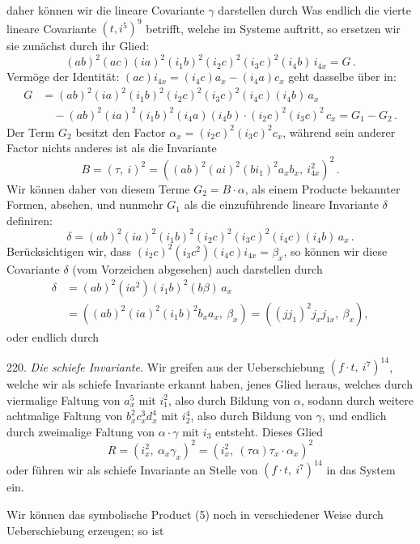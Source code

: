 daher k\"onnen wir die lineare Covariante $\gamma$ darstellen durch
Was endlich die vierte lineare Covariante $(t, i^5)^9$ betrifft, welche im Systeme auftritt, so ersetzen wir sie zun\"achst durch ihr Glied:
\[
(ab)^2(ac)(ia)^2(i_1b)^2(i_2c)^2(i_3c)^2(i_4b)\,i_{4x} = G\,.
\]
Verm\"oge der Identit\"at: $(ac)i_{4x} = (i_4c)a_x - (i_4a)c_x$ geht dasselbe \"uber in:
\[
\begin{aligned}
G &= (ab)^2(ia)^2(i_1b)^2(i_2c)^2(i_3c)^2(i_4c)(i_4b)\,a_x \\
  &\quad - (ab)^2(ia)^2(i_1b)^2(i_4a)(i_4b)\cdot(i_2c)^2(i_3c)^2\,c_x = G_1 - G_2\,.
\end{aligned}
\]
Der Term $G_2$ besitzt den Factor $\alpha_x = (i_2c)^2(i_3c)^2 c_x$, w\"ahrend sein anderer Factor nichts anderes ist als die Invariante
\[
B = (\tau,\ i)^2 = ((ab)^2(ai)^2(bi_1)^2 a_x b_x,\ i_{4x}^2)^2\,.
\]
Wir k\"onnen daher von diesem Terme $G_2 = B \cdot \alpha$, als einem Producte bekannter Formen, absehen, und nunmehr $G_1$ als die einzuf\"uhrende lineare Invariante $\delta$ definiren:
\[
\delta = (ab)^2(ia)^2(i_1b)^2(i_2c)^2(i_3c)^2(i_4c)(i_4b)\,a_x\,.
\]
Ber\"ucksichtigen wir, dass $(i_2c)^2(i_3c^2)(i_4c)i_{4x} = \beta_x$, so k\"onnen wir diese Covariante $\delta$ (vom Vorzeichen abgesehen) auch darstellen durch
\[
\begin{aligned}
\delta &= (ab)^2(ia^2)(i_1b)^2(b\beta)\,a_x \\
       &= ((ab)^2(ia)^2(i_1b)^2 b_x a_x,\ \beta_x) = ((jj_1)^2 j_x j_{1x},\ \beta_x),
\end{aligned}
\]
oder endlich durch

220. \textit{Die schiefe Invariante.} Wir greifen aus der Ueberschiebung $(f\cdot t,\ i^7)^{14}$, welche wir als schiefe Invariante erkannt haben, jenes Glied heraus, welches durch viermalige Faltung von $a_x^5$ mit $i_1^2$, also durch Bildung von $\alpha$, sodann durch weitere achtmalige Faltung von $b_x^2 c_x^3 d_x^4$ mit $i_2^4$, also durch Bildung von $\gamma$, und endlich durch zweimalige Faltung von $\alpha \cdot \gamma$ mit $i_3$ entsteht. Dieses Glied
\[
R = (i_x^2,\ \alpha_x \gamma_x)^2 = (i_x^2,\ (\tau\alpha)\tau_x \cdot \alpha_x)^2
\]
oder
f\"uhren wir als schiefe Invariante an Stelle von $(f\cdot t,\ i^7)^{14}$ in das System ein.

Wir k\"onnen das symbolische Product (5) noch in verschiedener Weise durch Ueberschiebung erzeugen; so ist

